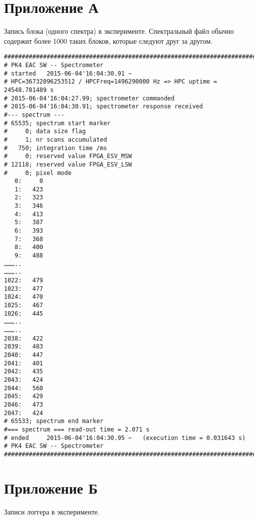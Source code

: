 
\chapter{Приложение А}
\label{app:app1}
Запись блока (одного спектра) в эксперименте. Спектральный файл обычно содержит более 1000 таких блоков, которые
следуют друг за другом.

\begin{small}
\begin{verbatim}
###############################################################################
# PK4 EAC SW -- Spectrometer
# started   2015-06-04'16:04:30.91 ~
# HPC=36732096253512 / HPCFreq=1496290000 Hz => HPC uptime = 24548.781489 s
# 2015-06-04'16:04:27.99; spectrometer commanded
# 2015-06-04'16:04:30.91; spectrometer response received
#--- spectrum ---
# 65535; spectrum start marker
#     0; data size flag
#     1; nr scans accumulated
#   750; integration time /ms
#     0; reserved value FPGA_ESV_MSW
# 12118; reserved value FPGA_ESV_LSW
#     0; pixel mode
   0:     0
   1:   423
   2:   323
   3:   346
   4:   413
   5:   387
   6:   393
   7:   368
   8:   400
   9:   488
………..
………..
1022:   479
1023:   477
1024:   470
1025:   467
1026:   445
………..
………..
2038:   422
2039:   483
2040:   447
2041:   401
2042:   435
2043:   424
2044:   560
2045:   429
2046:   473
2047:   424
# 65533; spectrum end marker
#=== spectrum === read-out time = 2.071 s
# ended     2015-06-04'16:04:30.95 ~   (execution time = 0.031643 s)
# PK4 EAC SW -- Spectrometer
###############################################################################
\end{verbatim}
\end{small}

\chapter{Приложение Б}
\label{app:app2}
Записи логгера в эксперименте.

